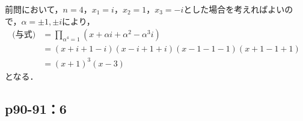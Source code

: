\documentclass[uplatex,dvipdfmx,a4paper,10pt,fleqn]{jsarticle}
\begin{document}
\begin{leftbar} 
    前問において，$n=4$，$x_1 = i$，$x_2 = 1$，$x_3=-i$とした場合を考えればよいので，$\alpha = \pm 1 , \pm i$により，
    \begin{align*} 
        \text{(与式)} & = \prod_{\alpha^4=1} (x+ \alpha i +\alpha^2 -  \alpha^3i ) \\
        & = (x+i+1-i) (x-i+1+i)(x-1-1-1)(x+1-1+1) \\
        & =(x+1)^3(x-3)
    \end{align*} 
    となる．
\end{leftbar}

\newpage 

\subsection*{p90-91：6}
\end{document}
